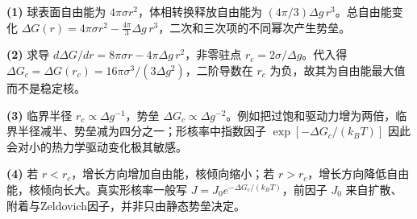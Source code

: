\par\noindent\textbf{(1)} 球表面自由能为 \(4\pi\sigma r^2\)，体相转换释放自由能为 \((4\pi/3)\Delta g\,r^3\)。总自由能变化 \(\Delta G(r)=4\pi\sigma r^2-\frac{4\pi}{3}\Delta g\,r^3\)，二次和三次项的不同幂次产生势垒。
\par\noindent\textbf{(2)} 求导 \(d\Delta G/dr=8\pi\sigma r-4\pi\Delta g\,r^2\)，非零驻点 \(r_c=2\sigma/\Delta g\)。代入得 \(\Delta G_c=\Delta G(r_c)=16\pi\sigma^3/(3\Delta g^2)\)，二阶导数在 \(r_c\) 为负，故其为自由能最大值而不是稳定核。
\par\noindent\textbf{(3)} 临界半径 \(r_c\propto\Delta g^{-1}\)，势垒 \(\Delta G_c\propto\Delta g^{-2}\)。例如把过饱和驱动力增为两倍，临界半径减半、势垒减为四分之一；形核率中指数因子 \(\exp[-\Delta G_c/(k_BT)]\) 因此会对小的热力学驱动变化极其敏感。
\par\noindent\textbf{(4)} 若 \(r<r_c\)，增长方向增加自由能，核倾向缩小；若 \(r>r_c\)，增长方向降低自由能，核倾向长大。真实形核率一般写 \(J=J_0e^{-\Delta G_c/(k_BT)}\)，前因子 \(J_0\) 来自扩散、附着与Zeldovich因子，并非只由静态势垒决定。
